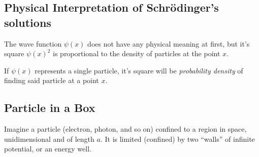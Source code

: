 \documentclass{article}[10pt]
\begin{document}
\subsection{Physical Interpretation of Schrödinger's solutions}

The wave function $\psi(x)$ does not have any physical meaning at first, but
it's square $\psi{(x)}^2$ is proportional to the density of particles at the point
$x$.

If $\psi(x)$ represents a single particle, it's square will be \emph{probability density}
of finding said particle at a point $x$.

\subsection{Particle in a Box}
Imagine a particle (electron, photon, and so on) confined to a region in space,
unidimensional and of length $a$. It is limited (confined) by two ``walls'' of
infinite potential, or an energy well.
\end{document}
